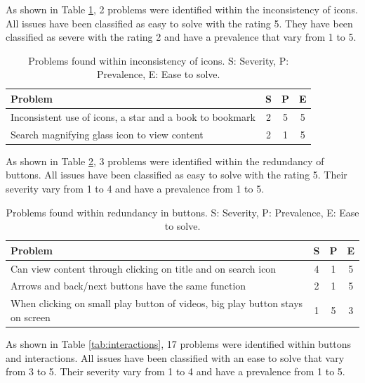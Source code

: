 \documentclass{sigchi}
\begin{document}
As shown in Table \ref{tab:icons}, 2 problems were identified within the inconsistency of icons. All issues have been classified as easy to solve with the rating 5. They have been classified as severe with the rating 2 and have a prevalence that vary from 1 to 5. 

\begin{table}[H]
    \centering
    \begin{tabular}{|m{6.5cm}|c|c|c|}
    \hline
        \textbf{Problem} & \textbf{S} & \textbf{P} & \textbf{E}\\
    \hline
         Inconsistent use of icons, a star and a book to bookmark  & 2 & 5 & 5\\
    \hline
         Search magnifying glass icon to view content & 2 & 1 & 5\\
    \hline
    \end{tabular}
    \caption{Problems found within inconsistency of icons. S: Severity, P: Prevalence, E: Ease to solve.}
    \label{tab:icons}
\end{table}

As shown in Table \ref{tab:redundancy}, 3 problems were identified within the redundancy of buttons. All issues have been classified as easy to solve with the rating 5. Their severity vary from 1 to 4 and have a prevalence from 1 to 5.

\begin{table}[H]
    \centering
    \begin{tabular}{|m{6.5cm}|c|c|c|}
    \hline
        \textbf{Problem} & \textbf{S} & \textbf{P} & \textbf{E}\\
    \hline
         Can view content through clicking on title and on search icon  & 4 & 1 & 5\\
    \hline
         Arrows and back/next buttons have the same function & 2 & 1 & 5\\
    \hline
         When clicking on small play button of videos, big play button stays on screen & 1 & 5 & 3\\
    \hline
    \end{tabular}
    \caption{Problems found within redundancy in buttons. S: Severity, P: Prevalence, E: Ease to solve.}
    \label{tab:redundancy}
\end{table}

As shown in Table \ref{tab:interactions}, 17 problems were identified within buttons and interactions. All issues have been classified with an ease to solve that vary from 3 to 5. Their severity vary from 1 to 4 and have a prevalence from 1 to 5.
\end{document}
